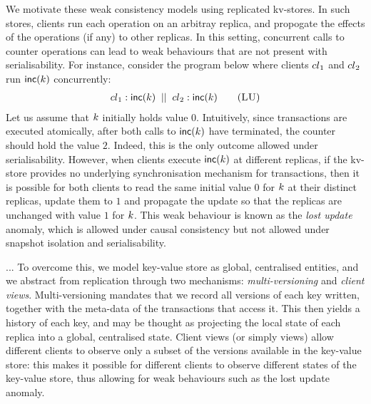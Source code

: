 We motivate  these weak consistency models using replicated kv-stores. In
such stores, clients run each operation on an arbitray replica, and
propogate the effects of the operations (if any) to other
replicas. In this setting, concurrent calls to counter
operations can lead to weak behaviours that are not present with
serialisability.
%
%
For instance, consider the program below where  clients ${cl}_1$ and 
${cl}_2$  run $\mathsf{inc}(k)$ concurrently: 
\begin{align}
	\cl_1: \ctrinc(\ke)
	\;\; || \;\;
	\cl_2: \ctrinc(\ke)
	\tag{\textsc{LU}}
	\label{prog:inc2}
\end{align}
Let us assume that  $k$ initially holds value $0$.
Intuitively, since transactions are executed atomically, after both
calls to $\mathsf{inc}(k)$ have terminated, the counter should hold 
the value $2$.
Indeed, this is the only outcome allowed under serialisability. 
However, when clients execute $\mathsf{inc}(k)$ at different replicas,
if the kv-store provides no underlying synchronisation mechanism for transactions,
 then it is possible for 
both clients to  read the same initial value $0$ for $k$ at their
distinct replicas, update them to $1$ and propagate the update so that 
 the replicas are unchanged with value  $1$ for $k$.
This weak behaviour is known as the \emph{lost update} anomaly, which
is  allowed under causal consistency but not allowed under snapshot
isolation and serialisability. 


...
To overcome this, we model key-value store as global, centralised entities, and 
we abstract from replication through two mechanisms: \emph{multi-versioning} and \emph{client views}. 
Multi-versioning mandates that we record all versions of each key written, 
together with the meta-data of the transactions that access it. 
This then yields a history of each key, and may be thought as projecting the local state of each replica into a global, centralised state. 
Client views (or simply views) allow different clients to observe only a subset of the versions available in 
the key-value store: this makes it possible for different clients to observe different states 
of the key-value store, thus allowing for weak behaviours such as the lost update anomaly. 

